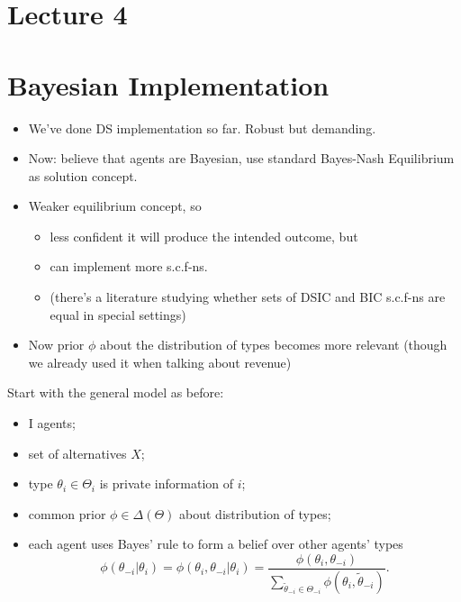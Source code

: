 \documentclass[english]{beamer}		%
\def\lyxframeend{} %
\begin{document}
\maketitle

\section{Lecture 4}

\section{Bayesian Implementation}

\begin{itemize}
	\item We've done DS implementation so far. Robust but demanding.
	\item Now: believe that agents are Bayesian, use standard Bayes-Nash Equilibrium as solution concept.
	\pause
	\item Weaker equilibrium concept, so
	\begin{itemize}
		\item less confident it will produce the intended outcome, but
		\item can implement more s.c.f-ns. 
		\item (there's a literature studying whether sets of DSIC and BIC s.c.f-ns are equal in special settings)
	\end{itemize}
	\item Now prior $\phi$ about the distribution of types becomes more relevant (though we already used it when talking about revenue)
\end{itemize}
\lyxframeend


Start with the general model as before:
\begin{itemize}
	\item I agents;
	\item set of alternatives $X$;
	\item type $\theta_{i}\in\Theta_{i}$ is private information of $i$;
	\item common prior $\phi \in \varDelta(\Theta)$ about distribution of types;
	\item each agent uses Bayes' rule to form a belief over other agents' types\\
	$$\phi(\theta_{-i}|\theta_{i}) = \phi(\theta_{i},\theta_{-i}|\theta_{i}) = \frac{\phi(\theta_{i}, \theta_{-i}) }{\sum_{\tilde\theta_{-i}\in\Theta_{-i}} \phi(\theta_{i},\tilde\theta_{-i})}.$$
\end{itemize}
\lyxframeend
\end{document}
